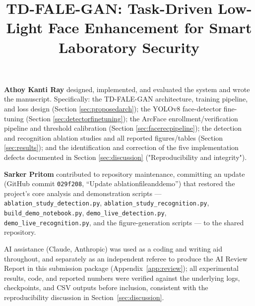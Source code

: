 \documentclass[conference]{IEEEtran}
\begin{document}
\title{TD-FALE-GAN: Task-Driven Low-Light Face Enhancement
for Smart Laboratory Security}

\author{
}

\maketitle

\begin{tcolorbox}[colback=gray!10,colframe=black,title=Contributions,fonttitle=\bfseries]
\textbf{Athoy Kanti Ray} designed, implemented, and evaluated the
system and wrote the manuscript. Specifically: the TD-FALE-GAN
architecture, training pipeline, and loss design (Section
\ref{sec:proposedarch}); the YOLOv8 face-detector fine-tuning
(Section \ref{sec:detectorfinetuning}); the ArcFace
enrollment/verification pipeline and threshold calibration
(Section \ref{sec:facerecpipeline}); the detection and recognition
ablation studies and all reported figures/tables (Section
\ref{sec:results}); and the identification and correction of the
five implementation defects documented in Section
\ref{sec:discussion} ("Reproducibility and integrity").

\textbf{Sarker Pritom} contributed to repository maintenance,
committing an update (GitHub commit \texttt{029f208}, ``Update
ablationfileanddemo'') that restored the project's core analysis
and demonstration scripts --- \texttt{ablation\_study\_detection.py},
\texttt{ablation\_study\_recognition.py}, \texttt{build\_demo\_notebook.py},
\texttt{demo\_live\_detection.py}, \texttt{demo\_live\_recognition.py},
and the figure-generation scripts --- to the shared repository.

AI assistance (Claude, Anthropic) was used as a coding and writing
aid throughout, and separately as an independent referee to
produce the AI Review Report in this submission package
(Appendix~\ref{app:review}); all experimental results, code, and
reported numbers were verified against the underlying logs,
checkpoints, and CSV outputs before inclusion, consistent with the
reproducibility discussion in Section~\ref{sec:discussion}.
\end{tcolorbox}
\end{document}
